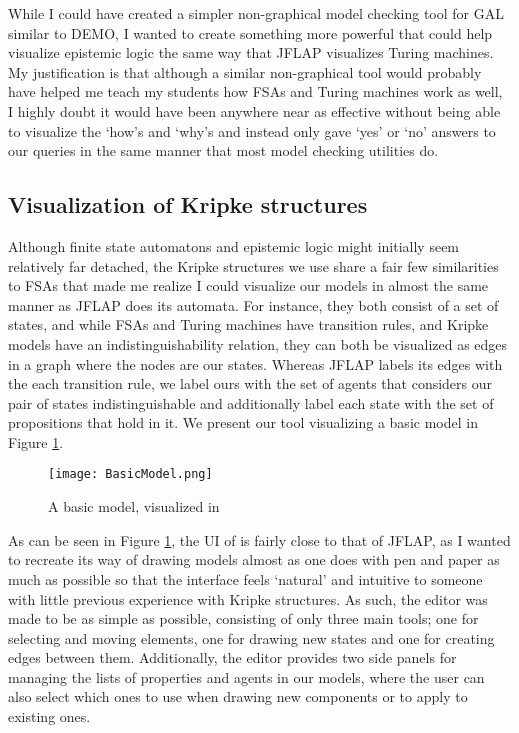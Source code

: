 While I could have created a simpler non-graphical model checking tool for GAL similar to DEMO, I wanted to create something more powerful that could help visualize epistemic logic the same way that JFLAP visualizes Turing machines. My justification is that although a similar non-graphical tool would probably have helped me teach my students how FSAs and Turing machines work as well, I highly doubt it would have been anywhere near as effective without being able to visualize the `how's and `why's and instead only gave `yes' or `no' answers to our queries in the same manner that most model checking utilities do. 

\subsection{Visualization of Kripke structures}
Although finite state automatons and epistemic logic might initially seem relatively far detached, the Kripke structures we use share a fair few similarities to FSAs that made me realize I could visualize our models in almost the same manner as JFLAP does its automata. For instance, they both consist of a set of states, and while FSAs and Turing machines have transition rules, and Kripke models have an indistinguishability relation, they can both be visualized as edges in a graph where the nodes are our states. Whereas JFLAP labels its edges with the each transition rule, we label ours with the set of agents that considers our pair of states indistinguishable and additionally label each state with the set of propositions that hold in it. We present our tool visualizing a basic model in Figure \ref{fig:basicModelVis}.


\begin{figure}[H]
	\texttt{[image: BasicModel.png]}
	\caption{A basic model, visualized in \cname}
	\label{fig:basicModelVis}
\end{figure} 

As can be seen in Figure \ref{fig:basicModelVis}, the UI of \cname{} is fairly close to that of JFLAP, as I wanted to recreate its way of drawing models almost as one does with pen and paper as much as possible so that the interface feels `natural' and intuitive to someone with little previous experience with Kripke structures. As such, the editor was made to be as simple as possible, consisting of only three main tools; one for selecting and moving elements, one for drawing new states and one for creating edges between them. Additionally, the editor provides two side panels for managing the lists of properties and agents in our models, where the user can also select which ones to use when drawing new components or to apply to existing ones.

